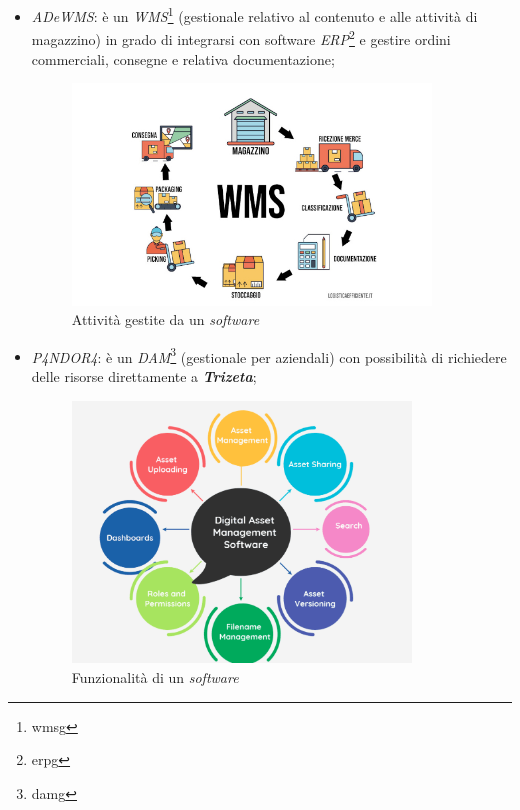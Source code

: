 \begin{itemize}
    \item \textit{ADeWMS}: è un \textit{WMS}\footnote{\gls{wmsg}} (gestionale relativo al contenuto e alle attività di magazzino) in grado di integrarsi con software \textit{ERP}\footnote{\gls{erpg}} e gestire ordini commerciali, consegne e relativa documentazione;
    \begin{figure}[H]
        \centering
        \includegraphics[width=0.9\textwidth]{images/wms.jpg}
        \caption[Caption for LOF]{Attività gestite da un \textit{software } \footnotemark}
    \end{figure}
    {}
    
    \item \textit{P4NDOR4}: è un \textit{DAM}\footnote{\gls{damg}} (gestionale per  aziendali) con possibilità di richiedere delle risorse direttamente a \textit{\textbf{Trizeta}};
    \begin{figure}[H]
        \centering
        \includegraphics[width=0.85\textwidth]{images/dam.png}
        \caption[Caption for LOF]{Funzionalità di un \textit{software } \footnotemark}
    \end{figure}
    {}


\end{itemize}

